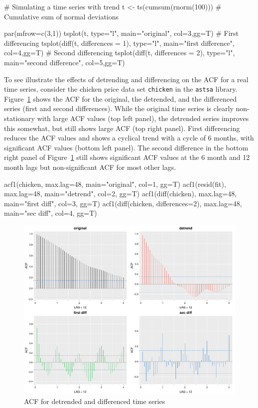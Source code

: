 \begin{samepage}
\begin{Rcode}
# Simulating a time series with trend
t <- ts(cumsum(rnorm(100)))  # Cumulative sum of normal deviations

par(mfrow=c(3,1))
tsplot(t, type="l", main="original", col=3,gg=T)
# First differencing
tsplot(diff(t, differences = 1), type="l", 
    main="first difference", col=4,gg=T)
# Second differencing
tsplot(diff(t, differences = 2), type="l", 
    main="second difference", col=5,gg=T)
\end{Rcode}
\end{samepage}

To see illustrate the effects of detrending and differencing on the ACF for a real time series, consider the chicken price data set \texttt{chicken} in the \texttt{astsa} library. Figure~\ref{fig:figure41} shows the ACF for the original, the detrended, and the differenced series (first and second differences). While the original time series is clearly non-stationary with large ACF values (top left panel), the detrended series improves this somewhat, but still shows large ACF (top right panel). First differencing reduces the ACF values and shows a cyclical trend with a cycle of 6 months, with significant ACF values (bottom left panel). The second difference in the bottom right panel of Figure~\ref{fig:figure41} still shows significant ACF values at the 6 month and 12 month lags but non-significant ACF for most other lags. 

\begin{Rcode}
acf1(chicken, max.lag=48, main="original", col=1, gg=T)
acf1(resid(fit), max.lag=48, main="detrend", col=2, gg=T)
acf1(diff(chicken), max.lag=48, main="first diff", col=3, gg=T)
acf1(diff(chicken, differences=2), max.lag=48, 
    main="sec diff", col=4, gg=T)
\end{Rcode}

\begin{figure}
\centering
\includegraphics[width=.75\textwidth]{figure41.pdf}
\caption{ACF for detrended and differenced time series}
\label{fig:figure41}
\end{figure}

